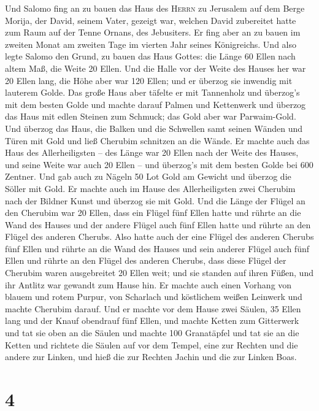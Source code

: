  Und Salomo fing an zu bauen das Haus des \textsc{Herrn}
zu Jerusalem auf dem Berge Morija, der David, seinem Vater, gezeigt war,
welchen David zubereitet hatte zum Raum auf der Tenne Ornans, des
Jebusiters.  Er fing aber an zu bauen im zweiten Monat am
zweiten Tage im vierten Jahr seines Königreichs.  Und also
legte Salomo den Grund, zu bauen das Haus Gottes: die Länge 60 Ellen
nach altem Maß, die Weite 20 Ellen.  Und die Halle vor der
Weite des Hauses her war 20 Ellen lang, die Höhe aber war 120 Ellen; und
er überzog sie inwendig mit lauterem Golde.  Das große
Haus aber täfelte er mit Tannenholz und überzog's mit dem besten Golde
und machte darauf Palmen und Kettenwerk  und überzog das
Haus mit edlen Steinen zum Schmuck; das Gold aber war Parwaim-Gold.
 Und überzog das Haus, die Balken und die Schwellen samt
seinen Wänden und Türen mit Gold und ließ Cherubim schnitzen an die
Wände.  Er machte auch das Haus des Allerheiligsten -- des
Länge war 20 Ellen nach der Weite des Hauses, und seine Weite war auch
20 Ellen -- und überzog's mit dem besten Golde bei 600 Zentner.
 Und gab auch zu Nägeln 50 Lot Gold am Gewicht und überzog
die Söller mit Gold.  Er machte auch im Hause des
Allerheiligsten zwei Cherubim nach der Bildner Kunst und überzog sie mit
Gold.  Und die Länge der Flügel an den Cherubim war 20
Ellen, dass ein Flügel fünf Ellen hatte und rührte an die Wand des
Hauses und der andere Flügel auch fünf Ellen hatte und rührte an den
Flügel des anderen Cherubs.  Also hatte auch der eine
Flügel des anderen Cherubs fünf Ellen und rührte an die Wand des Hauses
und sein anderer Flügel auch fünf Ellen und rührte an den Flügel des
anderen Cherubs,  dass diese Flügel der Cherubim waren
ausgebreitet 20 Ellen weit; und sie standen auf ihren Füßen, und ihr
Antlitz war gewandt zum Hause hin.  Er machte auch einen
Vorhang von blauem und rotem Purpur, von Scharlach und köstlichem weißen
Leinwerk und machte Cherubim darauf.  Und er machte vor
dem Hause zwei Säulen, 35 Ellen lang und der Knauf obendrauf fünf Ellen,
 und machte Ketten zum Gitterwerk und tat sie oben an die
Säulen und machte 100 Granatäpfel und tat sie an die Ketten
 und richtete die Säulen auf vor dem Tempel, eine zur
Rechten und die andere zur Linken, und hieß die zur Rechten Jachin und
die zur Linken Boas.

\hypertarget{section-3}{%
\section{4}\label{section-3}}

